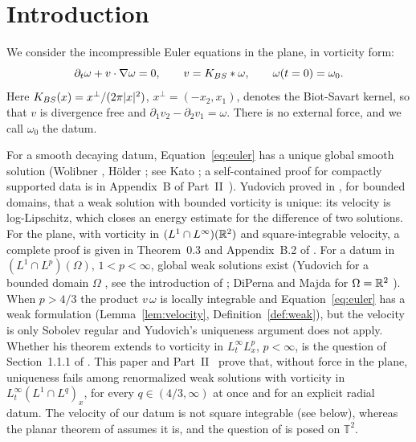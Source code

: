 \section{Introduction}

We consider the incompressible Euler equations in the plane, in vorticity form:
\begin{equation}
\label{eq:euler}
\partial_t \omega + v\cdot\nabla \omega = 0,\qquad
v = K_{BS}\ast \omega,\qquad
\omega(t=0) = \omega_0 .
\end{equation}
Here $K_{BS}(x)=x^\perp/(2\pi|x|^2)$, $x^\perp=(-x_2,x_1)$, denotes the
Biot-Savart kernel, so that $v$ is divergence free and
$\partial_1v_2-\partial_2v_1=\omega$. There is no external force, and we call
$\omega_0$ the datum.

For a smooth decaying datum, Equation~\eqref{eq:euler} has a unique global
smooth solution (Wolibner \cite{Wolibner}, H\"older \cite{Holder}; see Kato
\cite{Kato1967}; a self-contained proof for compactly supported data is in
Appendix~B of Part~II~\cite{PartII}). Yudovich proved in \cite{Yudovich1963}, for
bounded domains, that a weak solution with bounded vorticity is unique: its
velocity is log-Lipschitz, which closes an energy estimate for the difference of
two solutions. For the
plane, with vorticity in $(L^1\cap L^\infty)(\mathbb{R}^2)$ and square-integrable
velocity, a complete proof is given in Theorem~0.3 and Appendix~B.2 of \cite{ABCDGJK}.
For a datum in $(L^1\cap L^p)(\Omega)$, $1<p<\infty$, global weak solutions exist
(Yudovich for a bounded domain $\Omega$ \cite{Yudovich1963}, see the introduction of
\cite{Yudovich1995}; DiPerna and Majda for $\Omega=\mathbb{R}^2$ \cite{DiPernaMajda}). When $p>4/3$ the product $v\,\omega$ is
locally integrable and Equation~\eqref{eq:euler} has a weak formulation
(Lemma~\ref{lem:velocity}, Definition~\ref{def:weak}), but the velocity is only
Sobolev regular and Yudovich's uniqueness argument does not apply. Whether his theorem
extends to vorticity in $L^\infty_tL^p_x$, $p<\infty$, is the question of
Section~1.1.1 of \cite{BrueColomboKumar}. This paper and Part~II~\cite{PartII} prove that, without force in the
plane, uniqueness fails among renormalized weak solutions with vorticity in
$L^\infty_t(L^1\cap L^q)_x$, for every $q\in(4/3,\infty)$ at once and for an
explicit radial datum. The velocity of our datum is not square integrable (see
below), whereas the planar theorem of \cite{ABCDGJK} assumes
it is, and the question of \cite{BrueColomboKumar} is posed on $\mathbb T^2$.


